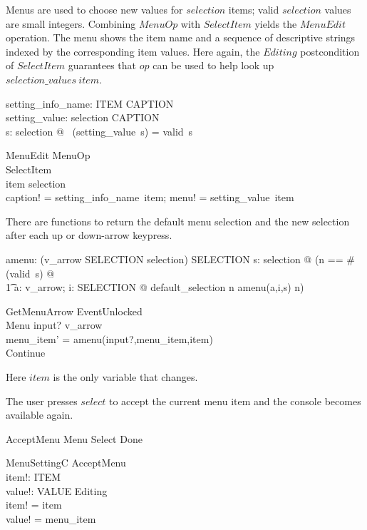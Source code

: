 Menus are used to choose new values for $selection$ items; valid
$selection$ values are small integers.  Combining $MenuOp$ with
$SelectItem$ yields the $MenuEdit$ operation. The menu shows the item
name and a sequence of descriptive strings indexed by the
corresponding item values. Here again, the $Editing$ postcondition of
$SelectItem$ guarantees that $op$ can be used to help look up
$selection\_values~item$.

\begin{axdef}
	setting\_info\_name: ITEM \fun CAPTION \\
	setting\_value: selection \fun \iseq CAPTION \\
\where
	\forall s: selection @ \dom~(setting\_value~s) = valid~s
\end{axdef}

\begin{schema}{MenuEdit}
	MenuOp \\
	SelectItem \\
\where
	item \in selection \\
	caption! = setting\_info\_name~item;
	menu! = setting\_value~item
\end{schema}
There are functions to return the default menu selection and the new
selection after each up or down-arrow keypress.

\begin{axdef}
	amenu: (v\_arrow \cross SELECTION \cross selection) \fun SELECTION
\where
\forall s: selection @ (\LET n == \# (valid~s) @ \\
\t1	\forall a: v\_arrow; i: SELECTION @ default\_selection \leq n \land amenu(a,i,s) \leq n)
\end{axdef}

\begin{schema}{GetMenuArrow}
	EventUnlocked \\
	\Delta Menu
\where
	input? \in v\_arrow \\
	menu\_item' = amenu(input?,menu\_item,item) \\
	Continue 
\end{schema}
Here $item$ is the only variable that changes.

The user presses $select$ to accept the current menu item and the
console becomes available again.

\begin{zed} AcceptMenu  Menu \land Select \land Done \end{zed}

\begin{schema}{MenuSettingC}
	AcceptMenu \\
	item!: ITEM \\
	value!: VALUE
\where
	Editing \\
	item! = item \\
	value! = menu\_item
\end{schema}

